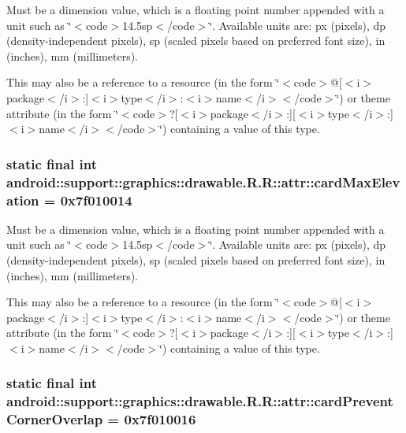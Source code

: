 Must be a dimension value, which is a floating point number appended with a unit such as \char`\"{}$<$code$>$14.5sp$<$/code$>$\char`\"{}. Available units are: px (pixels), dp (density-independent pixels), sp (scaled pixels based on preferred font size), in (inches), mm (millimeters). 

This may also be a reference to a resource (in the form \char`\"{}$<$code$>$@\mbox{[}$<$i$>$package$<$/i$>$:\mbox{]}$<$i$>$type$<$/i$>$:$<$i$>$name$<$/i$>$$<$/code$>$\char`\"{}) or theme attribute (in the form \char`\"{}$<$code$>$?\mbox{[}$<$i$>$package$<$/i$>$:\mbox{]}\mbox{[}$<$i$>$type$<$/i$>$:\mbox{]}$<$i$>$name$<$/i$>$$<$/code$>$\char`\"{}) containing a value of this type. \hypertarget{classandroid_1_1support_1_1graphics_1_1drawable_1_1_r_1_1attr_fe983c9814a7340660c1d6e7b4af17df}{
\subsubsection[{cardMaxElevation}]{\setlength{\rightskip}{0pt plus 5cm}static final int android::support::graphics::drawable.R.R::attr::cardMaxElevation = 0x7f010014}}
\label{classandroid_1_1support_1_1graphics_1_1drawable_1_1_r_1_1attr_fe983c9814a7340660c1d6e7b4af17df}


Must be a dimension value, which is a floating point number appended with a unit such as \char`\"{}$<$code$>$14.5sp$<$/code$>$\char`\"{}. Available units are: px (pixels), dp (density-independent pixels), sp (scaled pixels based on preferred font size), in (inches), mm (millimeters). 

This may also be a reference to a resource (in the form \char`\"{}$<$code$>$@\mbox{[}$<$i$>$package$<$/i$>$:\mbox{]}$<$i$>$type$<$/i$>$:$<$i$>$name$<$/i$>$$<$/code$>$\char`\"{}) or theme attribute (in the form \char`\"{}$<$code$>$?\mbox{[}$<$i$>$package$<$/i$>$:\mbox{]}\mbox{[}$<$i$>$type$<$/i$>$:\mbox{]}$<$i$>$name$<$/i$>$$<$/code$>$\char`\"{}) containing a value of this type. \hypertarget{classandroid_1_1support_1_1graphics_1_1drawable_1_1_r_1_1attr_571a6bee8997bdfec9918930b50dbb41}{
\subsubsection[{cardPreventCornerOverlap}]{\setlength{\rightskip}{0pt plus 5cm}static final int android::support::graphics::drawable.R.R::attr::cardPreventCornerOverlap = 0x7f010016}}
\label{classandroid_1_1support_1_1graphics_1_1drawable_1_1_r_1_1attr_571a6bee8997bdfec9918930b50dbb41}


